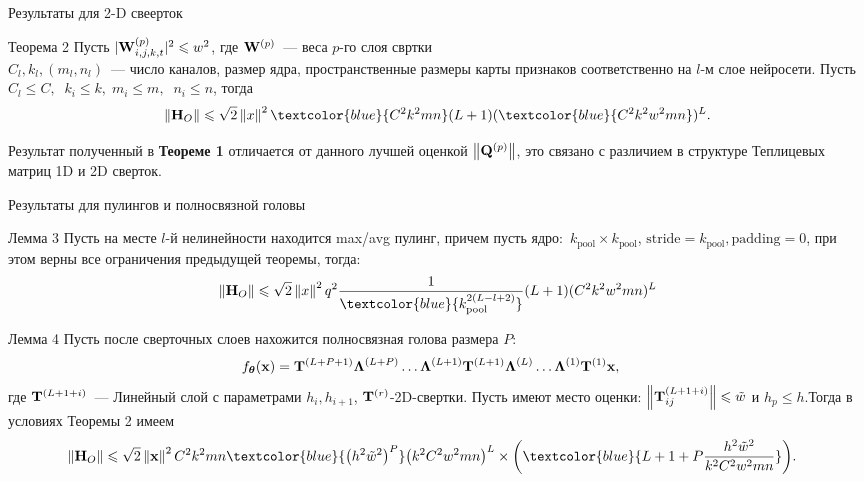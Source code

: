 \documentclass[aspectratio=169]{beamer}
\begin{document}
\begin{frame}{Результаты для 2-D свеерток}
\begin{block}{Теорема 2}
    Пусть $|\mathbf{W}^{(p)}_{i,j,k,t}|^2 \leqslant w^2$, где $\mathbf{W}^{(p)}$~--- веса $p$-го слоя свртки \\
    $C_l, k_l, (m_l, n_l)$~--- число каналов, размер ядра, пространственные размеры карты признаков соответственно на $l$-м слое нейросети.
    Пусть $C_l \leqslant C, \;\; k_i \leqslant k,\; m_i \leqslant m, \;\; n_i \leqslant n$, тогда \\
    \vspace{-0.75em}
    \[\norm{\bH_O} \leqslant \sqrt{2}\norm{x}^2\textcolor{blue}{C^2k^2mn}(L+1)(\textcolor{blue}{C^2k^2w^2mn})^L.\]
\end{block}

Результат полученный в \textbf{Теореме 1} отличается от данного лучшей оценкой $\left\|\mathbf{Q}^{(p)}\right\|$, это связано с различием в структуре Теплицевых матриц 1D и 2D сверток.

\end{frame}

\begin{frame}{Результаты для пулингов и полносвязной головы}
    \begin{block}{Лемма 3}
        Пусть на месте $l$-й нелинейности находится max/avg пулинг, причем пусть ядро:~$k_{\mathrm{pool}} \times k_{\mathrm{pool}}$, $\textrm{stride}=k_{\mathrm{pool}}, \textrm{padding}=0$, при этом верны все ограничения предыдущей теоремы, тогда: \\
        \vspace{-1.5em}
        \[\norm{\bH_O} \leqslant \sqrt{2}\norm{x}^2q^2\frac{1}{\textcolor{blue}{k_{\mathrm{pool}}^{2(L-l+2)}}}(L+1)(C^2k^2w^2mn)^L\]
    \end{block}
    \vspace{-1.5em}
    \begin{block}{Лемма 4}
        Пусть после сверточных слоев нахожится полносвязная голова размера $P$:
        \vspace{-0.5em}
        \begin{align*}
        & f_{\boldsymbol{\theta}}{(\mathbf{x})} = \mathbf{T}^{(L+P+1)}\boldsymbol{\Lambda}^{(L+P)} \dots \boldsymbol{\Lambda}^{(L+1)}\mathbf{T}^{(L+1)}\boldsymbol{\Lambda}^{(L)}\dots \boldsymbol{\Lambda}^{(1)}\mathbf{T}^{(1)}\mathbf{x},
        \end{align*}
        где $\mathbf{T}^{(L+1+i)}$~--- Линейный слой с параметрами $h_{i}, h_{i+1}$, $\mathbf{T}^{(r)}$-2D-свертки. Пусть имеют место оценки: $\left\|\mathbf{T}^{(L+1+i)}_{ij}\right\| \leqslant \tilde{w}$ и $h_p \leqslant h$.Тогда в условиях Теоремы 2 имеем
        \vspace{-2.0em}
        \begin{align*}
        & \norm{\bH_{O}} \leqslant \sqrt{2}\norm{\bx}^2C^2k^2mn\textcolor{blue}{\big(h^2\tilde{w}^2\big)^P}\big(k^2C^2w^2mn\big)^L \times \bigg(\textcolor{blue}{L + 1 + P\frac{h^2\tilde{w}^2}{k^2C^2w^2mn}}\bigg).
        \end{align*}
    \end{block}
\end{frame}
\end{document}
